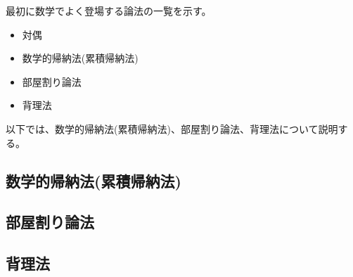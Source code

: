 \documentclass{jlreq}
\begin{document}
最初に数学でよく登場する論法の一覧を示す。

\begin{itemize}
  \item 対偶
  \item 数学的帰納法(累積帰納法)
  \item 部屋割り論法
  \item 背理法
\end{itemize}

以下では、数学的帰納法(累積帰納法)、部屋割り論法、背理法について説明する。

\subsection{数学的帰納法(累積帰納法)}

\subsection{部屋割り論法}

\subsection{背理法}
\end{document}

